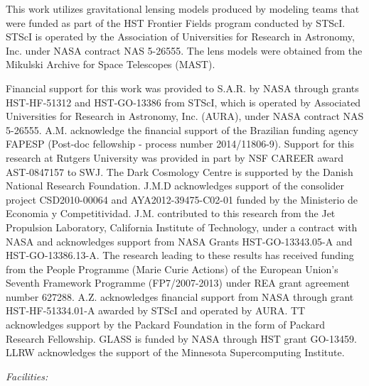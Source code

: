 This work utilizes gravitational lensing models produced by modeling
teams that were funded as part of the HST Frontier Fields program
conducted by STScI. STScI is operated by the Association of
Universities for Research in Astronomy, Inc. under NASA contract NAS
5-26555. The lens models were obtained from the Mikulski Archive for
Space Telescopes (MAST).

Financial support for this work was provided to S.A.R. by NASA through
grants HST-HF-51312 and HST-GO-13386 from STScI, which is operated by
Associated Universities for Research in Astronomy, Inc. (AURA), under
NASA contract NAS 5-26555. A.M. acknowledge the financial support of
the Brazilian funding agency FAPESP (Post-doc fellowship - process
number 2014/11806-9). Support for this research at Rutgers University
was provided in part by NSF CAREER award AST-0847157 to SWJ.  The Dark
Cosmology Centre is supported by the Danish National Research
Foundation. J.M.D acknowledges support of the consolider project
CSD2010-00064 and AYA2012-39475-C02-01 funded by the Ministerio de
Economia y Competitividad. J.M. contributed to this research from the
Jet Propulsion Laboratory, California Institute of Technology, under a
contract with NASA and acknowledges support from NASA Grants
HST-GO-13343.05-A and HST-GO-13386.13-A. The research leading to these
results has received funding from the People Programme (Marie Curie
Actions) of the European Union's Seventh Framework Programme
(FP7/2007-­2013) under REA grant agreement number
627288. A.Z. acknowledges financial support from NASA through grant
HST-HF-51334.01-A awarded by STScI and operated by AURA. 
TT acknowledges support by the Packard Foundation in the form of Packard Research Fellowship. GLASS is funded by NASA through HST grant GO-13459. LLRW
acknowledges the support of the Minnesota Supercomputing Institute.

{\it Facilities:} 
\smallskip




%


